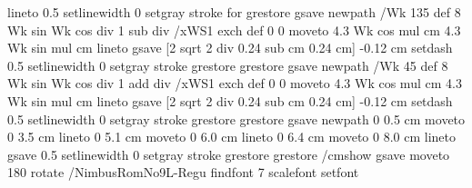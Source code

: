 {{{                         lineto
                         0.5 setlinewidth
                         0 setgray
                         stroke
                     } for
  grestore
  gsave
              newpath /Wk 135 def
               {8 Wk sin Wk cos div 1 sub div} /xWS1 exch def
               0 0 moveto
               4.3 Wk cos mul cm 4.3 Wk sin mul cm lineto
               gsave
                 [2 sqrt 2 div 0.24 sub cm 0.24 cm] -0.12 cm setdash
                 0.5 setlinewidth
                 0 setgray stroke
              grestore
  grestore
 gsave
              newpath /Wk 45 def
               {8 Wk sin Wk cos div 1 add div} /xWS1 exch def
               0 0 moveto
               4.3 Wk cos mul cm 4.3 Wk sin mul cm lineto
             gsave
               [2 sqrt 2 div 0.24 sub cm 0.24 cm] -0.12 cm setdash
               0.5 setlinewidth
               0 setgray stroke
             grestore
 grestore
  gsave
              newpath
              0 0.5 cm moveto
              0 3.5 cm lineto
              0 5.1 cm moveto
              0 6.0 cm lineto
              0 6.4 cm moveto
              0 8.0 cm lineto
              gsave
              0.5 setlinewidth
               0 setgray stroke
              grestore
  grestore
  /cmshow {%
                      gsave
                            moveto 180 rotate  %
                            /NimbusRomNo9L-Regu findfont 7 scalefont setfont
}}}

